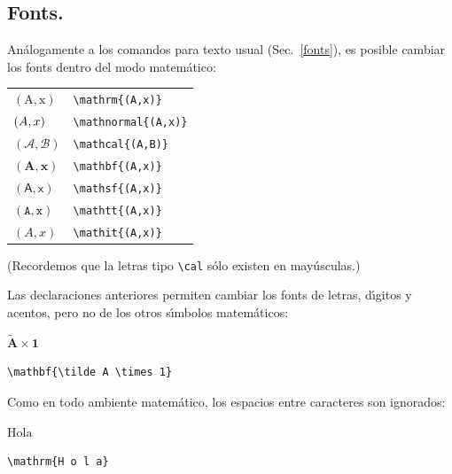 {\subsection{Fonts.}

An{\'a}logamente a los comandos para texto usual (Sec.\ \ref{fonts}),
es posible cambiar los fonts dentro del modo matem{\'a}tico:
\begin{center}
\begin{tabular}{l@{\hspace{2cm}}l}
$\mathrm{(A,x)}$ & \verb+\mathrm{(A,x)}+ \\
$\mathnormal{(A,x)}$ & \verb+\mathnormal{(A,x)}+ \\
$\mathcal{(A,B)}$ & \verb+\mathcal{(A,B)}+ \\
$\mathbf{(A,x)}$ & \verb+\mathbf{(A,x)}+ \\
$\mathsf{(A,x)}$ & \verb+\mathsf{(A,x)}+ \\
$\mathtt{(A,x)}$ & \verb+\mathtt{(A,x)}+ \\
$\mathit{(A,x)}$ & \verb+\mathit{(A,x)}+ 
\end{tabular}
\end{center}

(Recordemos que la letras tipo \verb+\cal+ s{\'o}lo existen en
may{\'u}sculas.) 

Las declaraciones anteriores permiten cambiar los fonts de letras,
d\'{\i}gitos y acentos, pero no de los otros s\'{\i}mbolos
matem{\'a}ticos: 

\vspace{.3cm}
{\small
\begin{minipage}[t]{3cm}
$\mathbf{\tilde A \times 1}$
\end{minipage}
\hspace{2cm}
\begin{minipage}[t]{3cm}
\begin{verbatim}
\mathbf{\tilde A \times 1}
\end{verbatim}
\end{minipage}
}
\vspace{.3cm}

Como en todo ambiente matem{\'a}tico, los espacios entre caracteres son
ignorados:

\vspace{.3cm}
{\small
\begin{minipage}[t]{3cm}
$\mathrm{H o l a}$
\end{minipage}
\hspace{2cm}
\begin{minipage}[t]{3cm}
\begin{verbatim}
\mathrm{H o l a}
\end{verbatim}
\end{minipage}
}
\vspace{.3cm}

}
